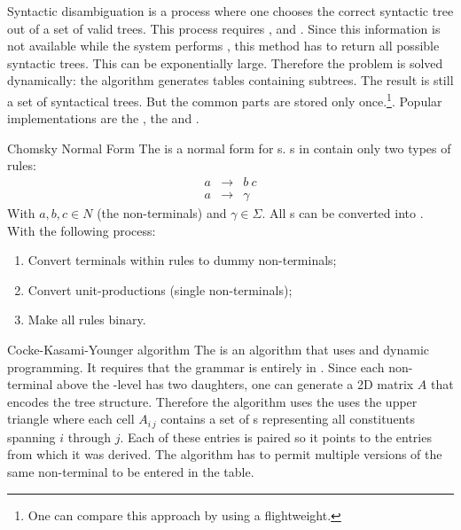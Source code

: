 \begin{df}{Syntactic disambiguation}
\sb{} is a process where one chooses the correct syntactic tree out of a set of valid trees. This process requires ,  and . Since this information is not available while the system performs , this method has to return all possible syntactic trees. This can be exponentially large. Therefore the problem is solved dynamically: the algorithm generates tables containing subtrees. The result is still a set of syntactical trees. But the common parts are stored only once.\footnote{One can compare this approach by using a flightweight.}. Popular implementations are the , the  and .
\end{df}
\begin{df}[CNF]{Chomsky Normal Form}
The \sb{} is a normal form for s. s in \sb{} contain only two types of rules:
\begin{eqnarray}
a&\rightarrow&b\ c\\
a&\rightarrow&\gamma
\end{eqnarray}
With $a,b,c\in N$ (the non-terminals) and $\gamma\in\Sigma$. All s can be converted into \sb{}. With the following process:
\begin{enumerate}
 \item Convert terminals within rules to dummy non-terminals;
 \item Convert unit-productions (single non-terminals);
 \item Make all rules binary.
\end{enumerate}
\end{df}
\begin{df}[CKY]{Cocke-Kasami-Younger algorithm}
The \sb{} is an algorithm that uses  and dynamic programming. It requires that the grammar is entirely in . Since each non-terminal above the -level has two daughters, one can generate a 2D matrix $A$ that encodes the tree structure. Therefore the algorithm uses the uses the upper triangle where each cell $A_{i\,j}$ contains a set of s representing all constituents spanning $i$ through $j$. Each of these entries is paired so it points to the entries from which it was derived. The algorithm has to permit multiple versions of the same non-terminal to be entered in the table.
\end{df}
